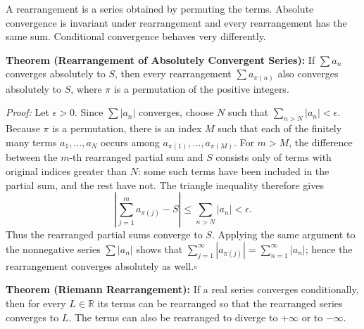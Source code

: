 \documentclass[a4paper,11pt,abstracton]{scrartcl}
\newcommand{\RR}{\mathbb{R}}
\theoremstyle{dotlessP}
\theoremstyle{dotlessS}
\theoremstyle{remark}
\theoremstyle{definition}
\begin{document}
A rearrangement is a series obtained by permuting the terms. Absolute
convergence is invariant under rearrangement and every rearrangement
has the same sum. Conditional convergence behaves very differently.

\begin{problem_box}
\textbf{Theorem (Rearrangement of Absolutely Convergent Series):}
If $\sum a_n$ converges absolutely to $S$, then every rearrangement
$\sum a_{\pi(n)}$ also converges absolutely to $S$, where $\pi$ is a
permutation of the positive integers.
\end{problem_box}

\begin{claim_box}
\textit{Proof:}
Let $\epsilon>0$. Since $\sum|a_n|$ converges, choose $N$ such that
$\sum_{n>N}|a_n|<\epsilon$. Because $\pi$ is a permutation, there is
an index $M$ such that each of the finitely many terms
$a_1,\ldots,a_N$ occurs among
$a_{\pi(1)},\ldots,a_{\pi(M)}$. For $m> M$, the difference between
the $m$-th rearranged partial sum and $S$ consists only of terms with
original indices greater than $N$: some such terms have been included
in the partial sum, and the rest have not. The triangle inequality
therefore gives
\[
    \left|\sum_{j=1}^m a_{\pi(j)}-S\right|
    \le \sum_{n>N}|a_n|<\epsilon.
\]
Thus the rearranged partial sums converge to $S$. Applying the same
argument to the nonnegative series $\sum|a_n|$ shows that
$\sum_{j=1}^{\infty}|a_{\pi(j)}|=\sum_{n=1}^{\infty}|a_n|$; hence the
rearrangement converges absolutely as well.\hfill$\square$
\end{claim_box}

\begin{problem_box}
\textbf{Theorem (Riemann Rearrangement):} If a real series converges
conditionally, then for every $L\in\RR$ its terms can be rearranged
so that the rearranged series converges to $L$. The terms can also be
rearranged to diverge to $+\infty$ or to $-\infty$.
\end{problem_box}
\end{document}
